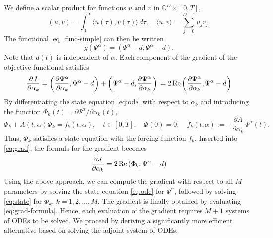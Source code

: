 \documentclass[11pt]{article}
\begin{document}
We define a scalar product for functions $u$ and $v$ in ${\mathbb C}^D \times [0,T]$,
\[
(u,v) = \int_0^T \langle u(\tau), v(\tau)\rangle\, d\tau,\quad \langle u, v\rangle =
\sum_{j=0}^{D-1} \bar{u}_j v_j.
\]
The functional \eqref{eq_func-simple} can then be written
\[
g(\Psi^\alpha) = (\Psi^\alpha - d, \Psi^\alpha - d).
\]
Note that $d(t)$ is independent of $\alpha$. Each component of the gradient of the objective
functional satisfies
\begin{equation}\label{eq:grad}
  \frac{\partial J}{\partial \alpha_k} =
%
  \left(\frac{\partial\Psi^\alpha}{\partial \alpha_k}, \Psi^\alpha-d \right) +
  \left(\Psi^\alpha-d, \frac{\partial\Psi^\alpha}{\partial \alpha_k} \right) \\
  = 2\, {\rm Re} \left(
\frac{\partial\Psi^\alpha}{\partial \alpha_k}, \Psi^\alpha-d \right)
\end{equation}
By differentiating the state equation \eqref{eq:ode} with respect to
$\alpha_k$ and introducing the function $\Phi_k(t) = \partial \Psi^\alpha/\partial \alpha_k(t)$,
\begin{equation}\label{eq:state}
\dot{\Phi}_k +
A(t,\alpha) \Phi_k = f_k(t,\alpha),\quad
t\in[0,T], \quad \Phi(0) = 0,\quad f_k(t,\alpha) := - \frac{\partial A}{\partial \alpha_k}\,\Psi^\alpha(t).
\end{equation}
Thus, $\Phi_k$ satisfies a state equation with the forcing function $f_k$. Inserted into
\eqref{eq:grad}, the formula for the gradient becomes
\begin{equation}\label{eq:grad-formula}
\frac{\partial J}{\partial \alpha_k} = 2\, {\rm Re} \left( \Phi_k, \Psi^\alpha - d \right)
\end{equation}
Using the above approach, we can compute the gradient with respect to all $M$ parameters by solving
the state equation \eqref{eq:ode} for $\Psi^\alpha$, followed by solving \eqref{eq:state} for
$\Phi_k$, $k=1,2,\ldots,M$. The gradient is finally obtained by evaluating \eqref{eq:grad-formula}. Hence,
each evaluation of the gradient requires $M+1$ systems of ODEs to be solved. We proceed by deriving a
significantly more efficient alternative based on solving the adjoint system of ODEs.
\end{document}
